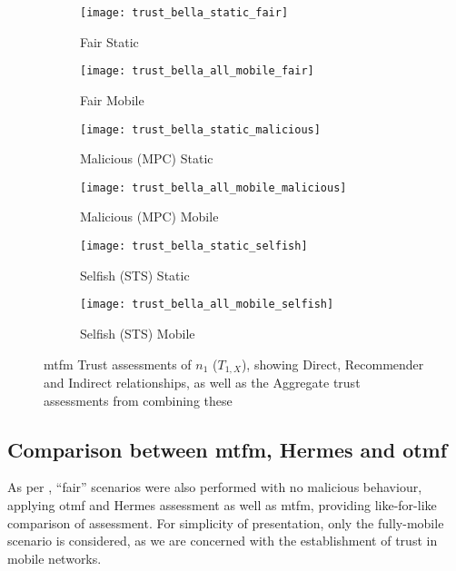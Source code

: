 \begin{figure}[h]
	\centering
	\begin{subfigure}{0.5\textwidth}
		\caption{Fair Static}
		\texttt{[image: trust\_bella\_static\_fair]} 
		\label{fig:trust_static}
	\end{subfigure}%
	\begin{subfigure}{0.5\textwidth}
		\caption{Fair Mobile}
		\texttt{[image: trust\_bella\_all\_mobile\_fair]}  
		\label{fig:trust_all_mobile}
	\end{subfigure}%
	
	\begin{subfigure}{0.5\textwidth}
		\caption{Malicious (MPC) Static}
		\texttt{[image: trust\_bella\_static\_malicious]} 
		\label{fig:trust_static_mal}
	\end{subfigure}%
	\begin{subfigure}{0.5\textwidth}
		\caption{Malicious (MPC) Mobile}
		\texttt{[image: trust\_bella\_all\_mobile\_malicious]}  
		\label{fig:trust_all_mobile_mal}
	\end{subfigure}%
	
	\begin{subfigure}{0.5\textwidth}
		\caption{Selfish (STS) Static}
		\texttt{[image: trust\_bella\_static\_selfish]}
		\label{fig:trust_static_sel}
	\end{subfigure}%
	\begin{subfigure}{0.5\textwidth}
		\caption{Selfish (STS) Mobile}
		\texttt{[image: trust\_bella\_all\_mobile\_selfish]}  \label{fig:trust_all_mobile_sel}
	\end{subfigure}%
	
	\caption{\gls{mtfm} Trust assessments of $n_1$ ($T_{1,X}$), showing Direct, Recommender and Indirect relationships, as well as the Aggregate trust assessments from combining these} 
	\label{fig:trust_mobility}
\end{figure}
%

\subsection{Comparison between \gls{mtfm}, Hermes and \gls{otmf}}
As per \cite{Guo11}, ``fair'' scenarios were also performed with no malicious behaviour, applying \gls{otmf} and Hermes assessment as well as \gls{mtfm}, providing like-for-like comparison of assessment.
For simplicity of presentation, only the fully-mobile scenario is considered, as we are concerned with the establishment of trust in mobile networks.

